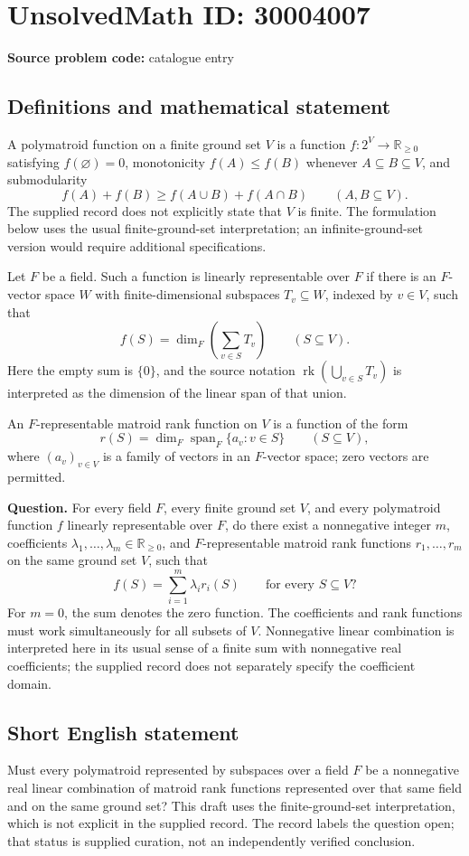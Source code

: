 \documentclass[11pt]{article}
\newcommand{\R}{\mathbb{R}}
\begin{document}
\section*{UnsolvedMath ID: 30004007}
\textbf{Source problem code:} catalogue entry
\subsection{Definitions and mathematical statement}
A polymatroid function on a finite ground set \(V\) is a function \(f:2^V\to\R_{\geq 0}\) satisfying \(f(\varnothing)=0\), monotonicity \(f(A)\leq f(B)\) whenever \(A\subseteq B\subseteq V\), and submodularity
\[
f(A)+f(B)\geq f(A\cup B)+f(A\cap B)\qquad(A,B\subseteq V).
\]
The supplied record does not explicitly state that \(V\) is finite. The formulation below uses the usual finite-ground-set interpretation; an infinite-ground-set version would require additional specifications.

Let \(F\) be a field. Such a function is linearly representable over \(F\) if there is an \(F\)-vector space \(W\) with finite-dimensional subspaces \(T_v\subseteq W\), indexed by \(v\in V\), such that
\[
f(S)=\dim_F\left(\sum_{v\in S}T_v\right)\qquad(S\subseteq V).
\]
Here the empty sum is \(\{0\}\), and the source notation \(\operatorname{rk}(\bigcup_{v\in S}T_v)\) is interpreted as the dimension of the linear span of that union.

An \(F\)-representable matroid rank function on \(V\) is a function of the form
\[
r(S)=\dim_F\operatorname{span}_F\{a_v:v\in S\}\qquad(S\subseteq V),
\]
where \((a_v)_{v\in V}\) is a family of vectors in an \(F\)-vector space; zero vectors are permitted.

\textbf{Question.} For every field \(F\), every finite ground set \(V\), and every polymatroid function \(f\) linearly representable over \(F\), do there exist a nonnegative integer \(m\), coefficients \(\lambda_1,\ldots,\lambda_m\in\R_{\geq 0}\), and \(F\)-representable matroid rank functions \(r_1,\ldots,r_m\) on the same ground set \(V\), such that
\[
f(S)=\sum_{i=1}^{m}\lambda_i r_i(S)\qquad\text{for every }S\subseteq V?
\]
For \(m=0\), the sum denotes the zero function. The coefficients and rank functions must work simultaneously for all subsets of \(V\). Nonnegative linear combination is interpreted here in its usual sense of a finite sum with nonnegative real coefficients; the supplied record does not separately specify the coefficient domain.
\subsection{Short English statement}
Must every polymatroid represented by subspaces over a field \(F\) be a nonnegative real linear combination of matroid rank functions represented over that same field and on the same ground set? This draft uses the finite-ground-set interpretation, which is not explicit in the supplied record. The record labels the question open; that status is supplied curation, not an independently verified conclusion.
\end{document}
